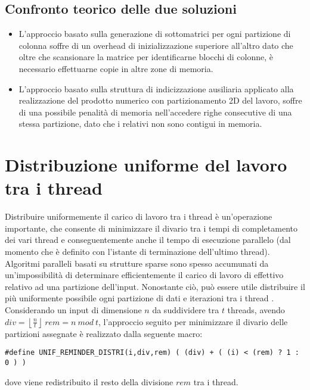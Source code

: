 \subsection{Confronto teorico delle due soluzioni}
\begin{itemize}
	\item
	L'approccio basato sulla generazione di sottomatrici per ogni partizione di colonna 
	soffre di un overhead di inizializzazione superiore all'altro dato che 
	oltre che scansionare la matrice per identificarne blocchi di colonne, è necessario effettuarne
	copie in altre zone di memoria.\\
	\item 
	L'approccio basato sulla struttura di indicizzazione ausiliaria applicato alla realizzazione
	del prodotto numerico con partizionamento 2D del lavoro, soffre di una possibile penalità di memoria
	nell'accedere righe consecutive di una stessa partizione, dato che i \nnz relativi non sono 
	contigui in memoria.
\end{itemize}

\section{Distribuzione uniforme del lavoro tra i thread}	\label{chSpMMAux:UNIF_REMINDER_DISTRI}
Distribuire uniformemente il carico di lavoro tra i thread è un'operazione importante,
che consente di minimizzare il divario tra i tempi di completamento dei vari thread 
e conseguentemente anche il tempo di esecuzione parallelo
(dal momento che è definito con l'istante di terminazione dell'ultimo thread).\\

Algoritmi paralleli basati su strutture sparse sono spesso accumunati da 
un'impossibilità di determinare efficientemente il carico di lavoro di effettivo
relativo ad una partizione dell'input.
Nonostante ciò, può essere utile distribuire il più uniformente possibile ogni partizione 
di dati e iterazioni tra i thread .\\%
Considerando un input di dimensione $n$ da suddividere tra $t$ threads, avendo 
$div=\left\lfloor \frac{n}{t}  \right\rfloor ~ rem=n ~mod ~t$,
l'approccio seguito per minimizzare il divario delle partizioni assegnate %
è realizzato dalla seguente macro:
\begin{lstlisting}
#define UNIF_REMINDER_DISTRI(i,div,rem)	( (div) + ( (i) < (rem) ? 1 : 0 ) )
\end{lstlisting}
dove viene redistribuito il resto della divisione $rem$ tra i thread.\\
